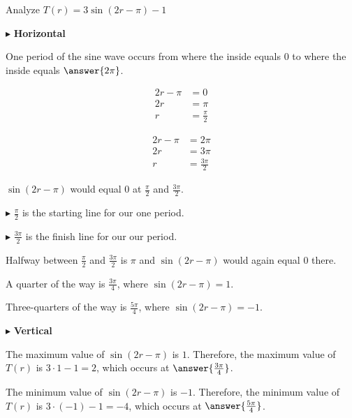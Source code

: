 \documentclass{ximera}
\begin{document}
\begin{example}



Analyze  $T(r) = 3 \sin(2r - \pi) - 1$


\begin{explanation}

$\blacktriangleright$ \textbf{Horizontal}


One period of the sine wave occurs from where the inside equals $0$ to where the inside equals $\answer{2 \pi}$.


\begin{align*}
2r - \pi & =  0 \\
2r       & =  \pi \\
r        & =  \frac{\pi}{2}
\end{align*}



\begin{align*}
2r - \pi & =  2 \pi \\
2r       & =  3 \pi \\
r        & =  \frac{3 \pi}{2}
\end{align*}


$\sin(2r - \pi)$ would equal $0$ at $\frac{\pi}{2}$ and $\frac{3 \pi}{2}$.



$\blacktriangleright$ $\frac{\pi}{2}$ is the starting line for our one period.

$\blacktriangleright$ $\frac{3 \pi}{2}$ is the finish line for our our period.




Halfway between $\frac{\pi}{2}$ and $\frac{3 \pi}{2}$ is $\pi$ and $\sin(2r - \pi)$ would again equal $0$ there.

A quarter of the way is $\frac{3 \pi}{4}$, where $\sin(2r - \pi) = 1$.

Three-quarters of the way is $\frac{5 \pi}{4}$, where $\sin(2r - \pi) = -1$.






$\blacktriangleright$ \textbf{Vertical}


The maximum value of $\sin(2r - \pi)$ is $1$.  Therefore, the maximum value of $T(r)$ is $3 \cdot 1 - 1 = 2$, which occurs at $\answer{\frac{3 \pi}{4}}$. 




The minimum value of $\sin(2r - \pi)$ is $-1$.  Therefore, the minimum value of $T(r)$ is $3 \cdot (-1) - 1 = -4$, which occurs at $\answer{\frac{5 \pi}{4}}$. 







\end{explanation}
\end{example}
\end{document}
